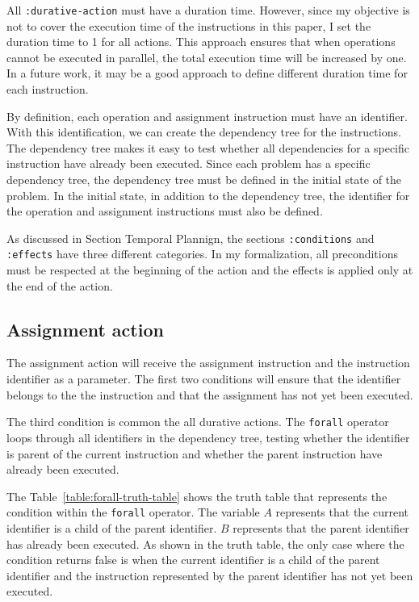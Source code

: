 \documentclass[letterpaper]{article}
\begin{document}
All \texttt{:durative-action} must have a duration time. However, since my objective is not to cover the execution time of the instructions in this paper, I set the duration time to 1 for all actions. This approach ensures that when operations cannot be executed in parallel, the total execution time will be increased by one. In a future work, it may be a good approach to define different duration time for each instruction.

By definition, each operation and assignment instruction must have an identifier. With this identification, we can create the dependency tree for the instructions. The dependency tree makes it easy to test whether all dependencies for a specific instruction have already been executed. Since each problem has a specific dependency tree, the dependency tree must be defined in the initial state of the problem. In the initial state, in addition to the dependency tree, the identifier for the operation and assignment instructions must also be defined.

As discussed in Section Temporal Plannign, the sections \texttt{:conditions} and \texttt{:effects} have three different categories. In my formalization, all preconditions must be respected at the beginning of the action and the effects is applied only at the end of the action.

\subsection{Assignment action}

The assignment action will receive the assignment instruction and the instruction identifier as a parameter. The first two conditions will ensure that the identifier belongs to the the instruction and that the assignment has not yet been executed.

The third condition is common the all durative actions. The \texttt{forall} operator loops through all identifiers in the dependency tree, testing whether the identifier is parent of the current instruction and whether the parent instruction have already been executed.

The Table~\ref{table:forall-truth-table} shows the truth table that represents the condition within the \texttt{forall} operator. The variable $A$ represents that the current identifier is a child of the parent identifier. $B$ represents that the parent identifier has already been executed. As shown in the truth table, the only case where the condition returns false is when the current identifier is a child of the parent identifier and the instruction represented by the parent identifier has not yet been executed.
\end{document}
